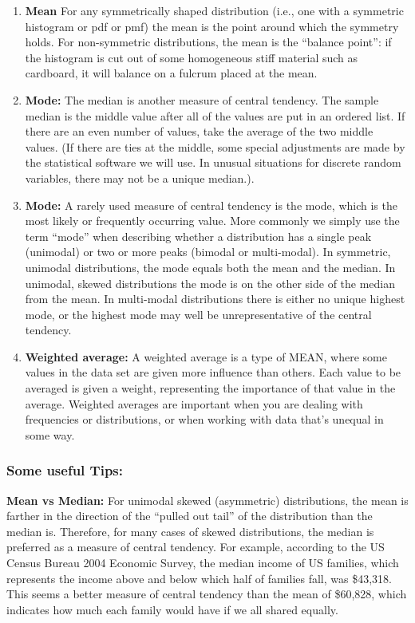 \documentclass[openany]{book}
\begin{document}
\begin{enumerate}
    \item \textbf{Mean} For any symmetrically shaped distribution (i.e., one with a symmetric histogram or pdf or pmf) the mean is the point around which the symmetry holds. For non-symmetric distributions, the mean is the “balance point”: if the histogram is cut out of some homogeneous stiff material such as cardboard, it will balance on a fulcrum placed at the mean. 
    \item \textbf{Mode:} The median is another measure of central tendency. The sample median is the middle value after all of the values are put in an ordered list. If there are an even number of values, take the average of the two middle values. (If there are ties at the middle, some special adjustments are made by the statistical software we will use. In unusual situations for discrete random variables, there may not be a unique median.). 
    
    \item \textbf{Mode:} A rarely used measure of central tendency is the mode, which is the most likely or frequently occurring value. More commonly we simply use the term “mode” when describing whether a distribution has a single peak (unimodal) or two or more peaks (bimodal or multi-modal). In symmetric, unimodal distributions, the mode equals both the mean and the median. In unimodal, skewed distributions the mode is on the other side of the median from the mean. In multi-modal distributions there is either no unique highest mode, or the highest mode may well be unrepresentative of the central tendency.

    \item \textbf{Weighted average:} A weighted average is a type of MEAN, where some values in the data set are given more influence than others. Each value to be averaged is given a weight, representing the importance of that value in the average. Weighted averages are important when you are dealing with frequencies or distributions, or when working with data that’s unequal in some way.


\end{enumerate}

\subsubsection{Some useful Tips:}

\textbf{Mean vs Median: } For unimodal skewed (asymmetric) distributions, the mean is farther in the direction of the “pulled out tail” of the distribution than the median is. Therefore, for many cases of skewed distributions, the median is preferred as a measure of central tendency. For example, according to the US Census Bureau 2004 Economic Survey, the median income of US families, which represents the income above and below which half of families fall, was \$43,318. This seems a better measure of central tendency than the mean of \$60,828, which indicates how much each family would have if we all shared equally. \\
\end{document}
